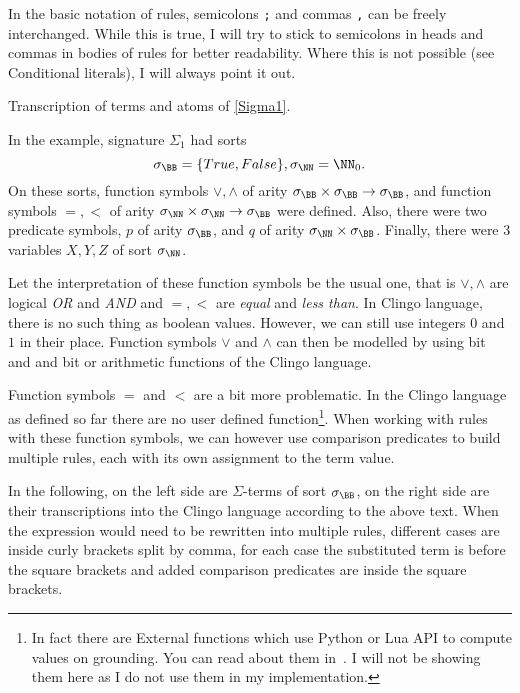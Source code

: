 In the basic notation of rules, semicolons \texttt{;} and commas \texttt{,}
can be freely interchanged. While this is true, I will try to stick to semicolons in heads
and commas in bodies of rules for better readability.
Where this is not possible (see Conditional literals), I will always point it out.

\begin{example}\label{exp:transcription_clingo}%
    Transcription of terms and atoms of \cref{Sigma1}.

    In the example, signature $\Sigma_1$ had sorts
    \begin{equation*}
        \sigma_\BB = \{True, False\}, \sigma_\NN = \NN_0.
    \end{equation*}
    On these sorts, function symbols $\vee, \wedge$ of arity
    $\sigma_\BB\times \sigma_\BB\to \sigma_\BB$,
    and function symbols $=, <$ of arity $\sigma_\NN\times\sigma_\NN\to \sigma_\BB$
    were defined.
    Also, there were two predicate symbols, $p$ of arity $\sigma_\BB$,
    and $q$ of arity $\sigma_\NN\times\sigma_\BB$.
    Finally, there were 3 variables $X, Y, Z$ of sort $\sigma_\NN$.

    Let the interpretation of these function symbols be the usual one,
    that is $\vee, \wedge$ are logical \textit{OR} and \textit{AND}
    and $=, <$ are \textit{equal} and \textit{less than}.
    In Clingo language, there is no such thing as boolean values. However, we can still use
    integers $0$ and $1$ in their place. Function symbols $\vee$ and $\wedge$
    can then be modelled by using bit and and bit or arithmetic functions of the Clingo language.

    Function symbols $=$ and $<$ are a bit more problematic.
    In the Clingo language as defined so far there are no user defined function\footnote{
        In fact there are External functions which use Python or Lua API
        to compute values on grounding.
        You can read about them in~\cite{gebser2019potassco}.
        I will not be showing them here as I do not use them in my implementation.
    }.
    When working with rules with these function symbols, we can however use
    comparison predicates to build multiple rules, each with its own assignment
    to the term value.

    In the following, on the left side are $\Sigma$-terms of sort $\sigma_\BB$,
    on the right side are their transcriptions into the Clingo language according to
    the above text. %
	When the expression would need to be rewritten into multiple rules,
    different cases are inside curly brackets split by comma, for each case the substituted term
    is before the square brackets and added comparison predicates are inside the square brackets.


\end{example}

